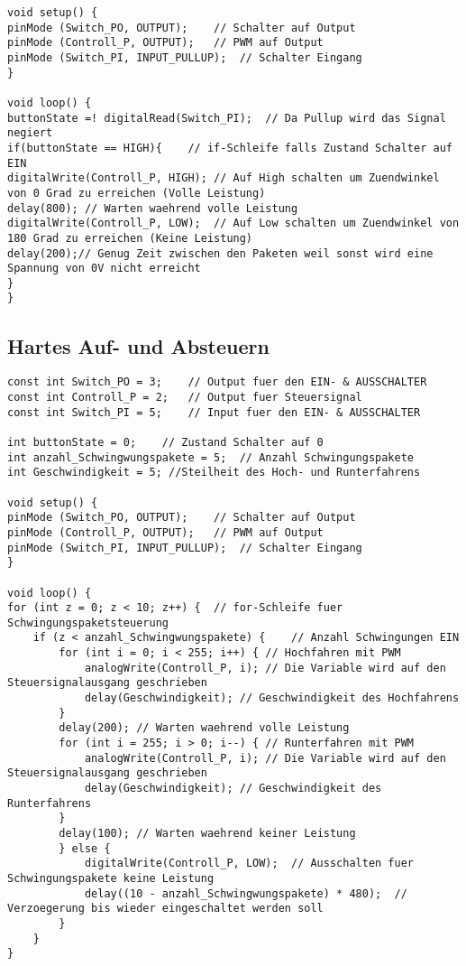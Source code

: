 \begin{appendix}
\begin{lstlisting}[basicstyle=\tiny,style=myArduino]
void setup() {
pinMode (Switch_PO, OUTPUT);	// Schalter auf Output
pinMode (Controll_P, OUTPUT);	// PWM auf Output
pinMode (Switch_PI, INPUT_PULLUP);	// Schalter Eingang
}

void loop() {
buttonState =! digitalRead(Switch_PI);	// Da Pullup wird das Signal negiert
if(buttonState == HIGH){	// if-Schleife falls Zustand Schalter auf EIN
digitalWrite(Controll_P, HIGH);	// Auf High schalten um Zuendwinkel von 0 Grad zu erreichen (Volle Leistung)
delay(800);	// Warten waehrend volle Leistung
digitalWrite(Controll_P, LOW);	// Auf Low schalten um Zuendwinkel von 180 Grad zu erreichen (Keine Leistung)
delay(200);// Genug Zeit zwischen den Paketen weil sonst wird eine Spannung von 0V nicht erreicht     
}
}
\end{lstlisting}

\subsection*{Hartes Auf- und Absteuern}
\begin{lstlisting}[basicstyle=\tiny,style=myArduino]
const int Switch_PO = 3;	// Output fuer den EIN- & AUSSCHALTER
const int Controll_P = 2;	// Output fuer Steuersignal
const int Switch_PI = 5;	// Input fuer den EIN- & AUSSCHALTER

int buttonState = 0;	// Zustand Schalter auf 0
int anzahl_Schwingwungspakete = 5;	// Anzahl Schwingungspakete
int Geschwindigkeit = 5; //Steilheit des Hoch- und Runterfahrens

void setup() {
pinMode (Switch_PO, OUTPUT);	// Schalter auf Output
pinMode (Controll_P, OUTPUT);	// PWM auf Output
pinMode (Switch_PI, INPUT_PULLUP);	// Schalter Eingang
}

void loop() {
for (int z = 0; z < 10; z++) {	// for-Schleife fuer Schwingungspaketsteuerung
	if (z < anzahl_Schwingwungspakete) {	// Anzahl Schwingungen EIN
		for (int i = 0; i < 255; i++) {	// Hochfahren mit PWM
			analogWrite(Controll_P, i);	// Die Variable wird auf den Steuersignalausgang geschrieben
			delay(Geschwindigkeit);	// Geschwindigkeit des Hochfahrens
		}
		delay(200);	// Warten waehrend volle Leistung
		for (int i = 255; i > 0; i--) {	// Runterfahren mit PWM
			analogWrite(Controll_P, i);	// Die Variable wird auf den Steuersignalausgang geschrieben
			delay(Geschwindigkeit);	// Geschwindigkeit des Runterfahrens
		}
		delay(100);	// Warten waehrend keiner Leistung
		} else {
			digitalWrite(Controll_P, LOW);	// Ausschalten fuer Schwingungspakete keine Leistung
			delay((10 - anzahl_Schwingwungspakete) * 480);	// Verzoegerung bis wieder eingeschaltet werden soll
		}
	}
}
\end{lstlisting}


\end{appendix}
